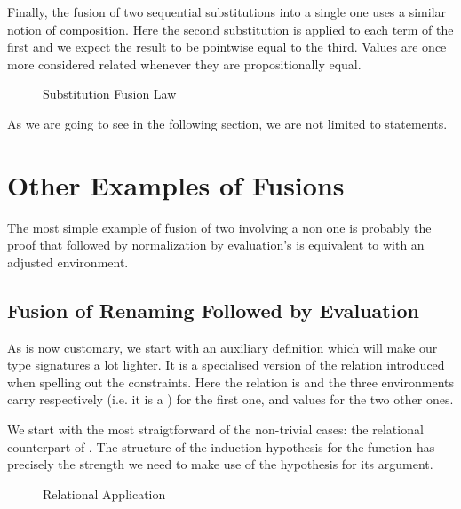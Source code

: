 Finally, the fusion of two sequential substitutions into a single one uses a
similar notion of composition. Here the second substitution is applied to each
term of the first and we expect the result to be pointwise equal to the third.
Values are once more considered related whenever they are propositionally equal.

\begin{figure}[h]
\caption{Substitution Fusion Law\label{fig:subsub}}
\end{figure}

As we are going to see in the following section, we are not limited
to  statements.

\section{Other Examples of Fusions}

The most simple example of fusion of two  involving a non 
one is probably the proof that  followed by normalization by evaluation's
 is equivalent to  with an adjusted environment.

\subsection{Fusion of Renaming Followed by Evaluation}
\label{sec:fusionrennbe}

As is now customary, we start with an auxiliary definition which will make our
type signatures a lot lighter. It is a specialised version of the relation 
introduced when spelling out the  constraints. Here the relation is 
and the three environments carry respectively  (i.e. it is a ) for
the first one, and  values for the two other ones.


We start with the most straigtforward of the non-trivial cases: the relational
counterpart of . The  structure of the induction hypothesis
for the function has precisely the strength we need to make use of the hypothesis
for its argument.

\begin{figure}[h]
\caption{Relational Application}
\end{figure}

